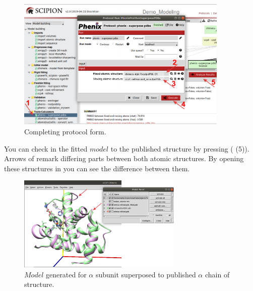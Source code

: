 \begin{itemize}
  \begin{figure}[H]
    \centering 
    \captionsetup{width=.7\linewidth} 
    \includegraphics[width=0.90\textwidth]{Images/Fig37}
    \caption{Completing \phenix {} protocol form.}
    \label{fig:superpose_pdbs_protocol}
    \end{figure}
    
  You can check in \chimera the fitted $model$ to the published structure by pressing  ( (5)). Arrows of  remark differing parts between both atomic structures. By opening these structures in \coot you can see the difference between them.
 
   \begin{figure}[H]
    \centering 
    \captionsetup{width=.7\linewidth} 
    \includegraphics[width=0.70\textwidth]{Images/Fig38}
    \caption{$Model$ generated for  $\alpha$ subunit superposed to published $\alpha$ chain of  structure.}
    \label{fig:superpose_pdbs_chimera}
   \end{figure}
  
  
  \end{itemize}
 
